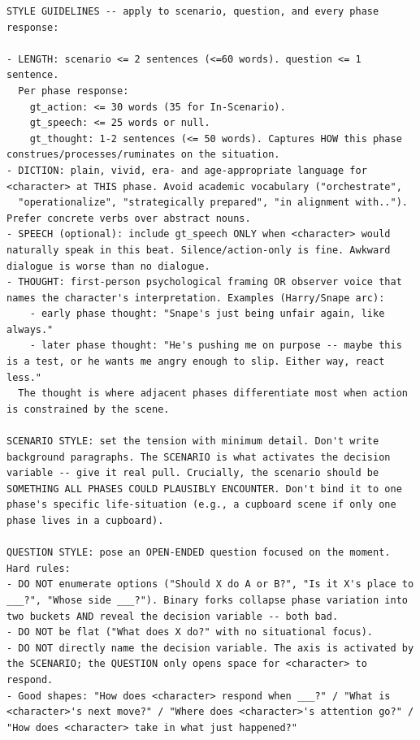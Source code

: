 \documentclass{llmxive}
\begin{document}
\begin{table}[htbp]
\centering
\begin{lstlisting}[basicstyle=\ttfamily\scriptsize]
STYLE GUIDELINES -- apply to scenario, question, and every phase response:

- LENGTH: scenario <= 2 sentences (<=60 words). question <= 1 sentence.
  Per phase response:
    gt_action: <= 30 words (35 for In-Scenario).
    gt_speech: <= 25 words or null.
    gt_thought: 1-2 sentences (<= 50 words). Captures HOW this phase construes/processes/ruminates on the situation.
- DICTION: plain, vivid, era- and age-appropriate language for <character> at THIS phase. Avoid academic vocabulary ("orchestrate",
  "operationalize", "strategically prepared", "in alignment with.."). Prefer concrete verbs over abstract nouns.
- SPEECH (optional): include gt_speech ONLY when <character> would naturally speak in this beat. Silence/action-only is fine. Awkward dialogue is worse than no dialogue.
- THOUGHT: first-person psychological framing OR observer voice that names the character's interpretation. Examples (Harry/Snape arc):
    - early phase thought: "Snape's just being unfair again, like always."
    - later phase thought: "He's pushing me on purpose -- maybe this is a test, or he wants me angry enough to slip. Either way, react less."
  The thought is where adjacent phases differentiate most when action is constrained by the scene.

SCENARIO STYLE: set the tension with minimum detail. Don't write background paragraphs. The SCENARIO is what activates the decision variable -- give it real pull. Crucially, the scenario should be SOMETHING ALL PHASES COULD PLAUSIBLY ENCOUNTER. Don't bind it to one phase's specific life-situation (e.g., a cupboard scene if only one phase lives in a cupboard).

QUESTION STYLE: pose an OPEN-ENDED question focused on the moment.
Hard rules:
- DO NOT enumerate options ("Should X do A or B?", "Is it X's place to ___?", "Whose side ___?"). Binary forks collapse phase variation into two buckets AND reveal the decision variable -- both bad.
- DO NOT be flat ("What does X do?" with no situational focus).
- DO NOT directly name the decision variable. The axis is activated by the SCENARIO; the QUESTION only opens space for <character> to respond.
- Good shapes: "How does <character> respond when ___?" / "What is <character>'s next move?" / "Where does <character>'s attention go?" / "How does <character> take in what just happened?"


\end{lstlisting}
\end{table}
\end{document}
